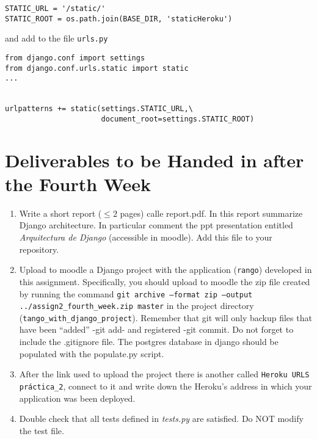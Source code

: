 \documentclass[12pt]{article} %
\begin{document}
\begin{verbatim}
STATIC_URL = '/static/'
STATIC_ROOT = os.path.join(BASE_DIR, 'staticHeroku')
\end{verbatim}

and add to the file  \texttt{urls.py}
\begin{verbatim}
from django.conf import settings
from django.conf.urls.static import static
...


urlpatterns += static(settings.STATIC_URL,\
                      document_root=settings.STATIC_ROOT)

\end{verbatim}

\section{Deliverables to be Handed in after the Fourth Week}

\begin{minipage}{\linewidth}
\begin{framed}
\begin{enumerate}
 \item Write a short report ($\leq2$ pages) calle report.pdf. In this report summarize Django architecture. In particular comment the ppt presentation entitled \textit{Arquitectura de Django} (accessible in moodle). Add this file to your repository.

 \item Upload to moodle a Django project with the application (\texttt{rango}) developed in this assignment. Specifically, you should upload to moodle the  zip file created by running the command \texttt{git archive --format zip --output ../assign2\_fourth\_week.zip  master} in the project directory (\texttt{tango\_with\_django\_project}). Remember that git will only backup files that have been ``added'' -git add- and registered -git commit. Do not forget to include the .gitignore file. The postgres database in django should be populated with the populate.py script.
 
\item After the link used to upload the project there is another called \texttt{Heroku URLS práctica\_2}, connect to it and write down the Heroku's address in which your application was been deployed.

\item Double check that all tests defined in \textit{tests.py} are satisfied. Do NOT modify the test file.

\end{enumerate}
\end{framed}
\end{minipage}\\\\
\end{document}
